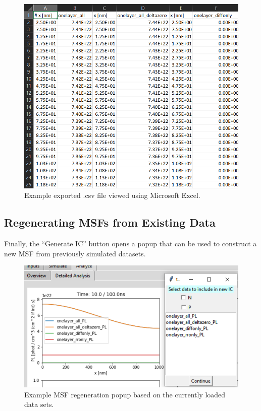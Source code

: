 \documentclass[11pt,letterpaper,titlepage]{article}
\begin{document}
		\begin{figure}[H]
			\label{fig:export_example}
			\centering
			\includegraphics[scale=0.8]{"export_example"}
			\caption{Example exported .csv file viewed using Microsoft Excel.}
		\end{figure}
	
		\subsection {Regenerating MSFs from Existing Data}
		
		\par Finally, the “Generate IC” button opens a popup that can be used to construct a new MSF from previously simulated datasets.
		
		\begin{figure}[H]
			\label{fig:carryover_example}
			\centering
			\includegraphics[scale=1]{"carryover_example"}
			\caption{Example MSF regeneration popup based on the currently loaded data sets.}
		\end{figure}
	
\end{document}
